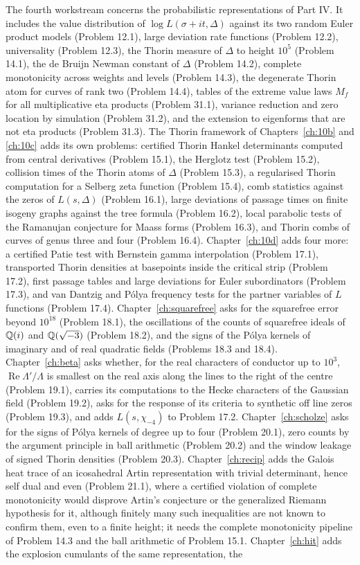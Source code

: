 The fourth workstream concerns the probabilistic representations of Part IV. It includes the value distribution of $\log L(\sigma+it,\Delta)$ against its two random Euler product models (Problem 12.1), large deviation rate functions (Problem 12.2), universality (Problem 12.3), the Thorin measure of $\Delta$ to height $10^5$ (Problem 14.1), the de Bruijn Newman constant of $\Delta$ (Problem 14.2), complete monotonicity across weights and levels (Problem 14.3), the degenerate Thorin atom for curves of rank two (Problem 14.4), tables of the extreme value laws $M_f$ for all multiplicative eta products (Problem 31.1), variance reduction and zero location by simulation (Problem 31.2), and the extension to eigenforms that are not eta products (Problem 31.3). The Thorin framework of Chapters~\ref{ch:10b} and \ref{ch:10c} adds its own problems: certified Thorin Hankel determinants computed from central derivatives (Problem 15.1), the Herglotz test (Problem 15.2), collision times of the Thorin atoms of $\Delta$ (Problem 15.3), a regularised Thorin computation for a Selberg zeta function (Problem 15.4), comb statistics against the zeros of $L(s,\Delta)$ (Problem 16.1), large deviations of passage times on finite isogeny graphs against the tree formula (Problem 16.2), local parabolic tests of the Ramanujan conjecture for Maass forms (Problem 16.3), and Thorin combs of curves of genus three and four (Problem 16.4). Chapter~\ref{ch:10d} adds four more: a certified Patie test with Bernstein gamma interpolation (Problem 17.1), transported Thorin densities at basepoints inside the critical strip (Problem 17.2), first passage tables and large deviations for Euler subordinators (Problem 17.3), and van Dantzig and P\'olya frequency tests for the partner variables of $L$ functions (Problem 17.4). Chapter~\ref{ch:squarefree} asks for the squarefree error beyond $10^{18}$ (Problem 18.1), the oscillations of the counts of squarefree ideals of $\mathbb{Q}(i)$ and $\mathbb{Q}(\sqrt{-3})$ (Problem 18.2), and the signs of the P\'olya kernels of imaginary and of real quadratic fields (Problems 18.3 and 18.4). Chapter~\ref{ch:beta} asks whether, for the real characters of conductor up to $10^3$, $\operatorname{Re}\Lambda'/\Lambda$ is smallest on the real axis along the lines to the right of the centre (Problem 19.1), carries its computations to the Hecke characters of the Gaussian field (Problem 19.2), asks for the response of its criteria to synthetic off line zeros (Problem 19.3), and adds $L(s,\chi_{-4})$ to Problem 17.2. Chapter~\ref{ch:scholze} asks for the signs of P\'olya kernels of degree up to four (Problem 20.1), zero counts by the argument principle in ball arithmetic (Problem 20.2) and the window leakage of signed Thorin densities (Problem 20.3). Chapter~\ref{ch:recip} adds the Galois heat trace of an icosahedral Artin representation with trivial determinant, hence self dual and even (Problem 21.1), where a certified violation of complete monotonicity would disprove Artin's conjecture or the generalized Riemann hypothesis for it, although finitely many such inequalities are not known to confirm them, even to a finite height; it needs the complete monotonicity pipeline of Problem 14.3 and the ball arithmetic of Problem 15.1. Chapter~\ref{ch:hit} adds the explosion cumulants of the same representation, the 
